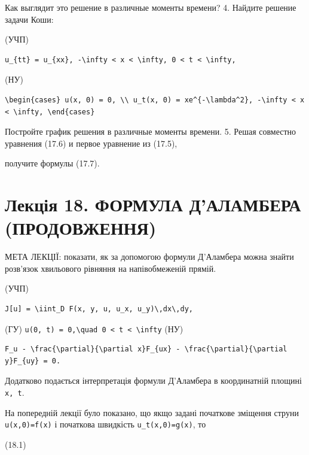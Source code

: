 \documentclass[
  ukrainian,
]{article}
\begin{document}
Как выглядит это решение в различные моменты времени? 4. Найдите решение
задачи Коши:

(УЧП)

\begin{verbatim}
u_{tt} = u_{xx}, -\infty < x < \infty, 0 < t < \infty,
\end{verbatim}

(НУ)

\begin{verbatim}
\begin{cases} u(x, 0) = 0, \\ u_t(x, 0) = xe^{-\lambda^2}, -\infty < x < \infty, \end{cases}
\end{verbatim}

Постройте график решения в различные моменты времени. 5. Решая совместно
уравнения (17.6) и первое уравнение из (17.5),

получите формулы (17.7).

\section{Лекція 18. ФОРМУЛА Д'АЛАМБЕРА
(ПРОДОВЖЕННЯ)}\label{ux43bux435ux43aux446ux456ux44f-18.-ux444ux43eux440ux43cux443ux43bux430-ux434ux430ux43bux430ux43cux431ux435ux440ux430-ux43fux440ux43eux434ux43eux432ux436ux435ux43dux43dux44f}

МЕТА ЛЕКЦІЇ: показати, як за допомогою формули Д'Аламбера можна знайти
розв'язок хвильового рівняння на напівобмеженій прямій.

(УЧП)

\begin{verbatim}
J[u] = \iint_D F(x, y, u, u_x, u_y)\,dx\,dy,
\end{verbatim}

(ГУ)
\texttt{u(0,\ t)\ =\ 0,\textbackslash{}quad\ 0\ \textless{}\ t\ \textless{}\ \textbackslash{}infty}
(НУ)

\begin{verbatim}
F_u - \frac{\partial}{\partial x}F_{ux} - \frac{\partial}{\partial y}F_{uy} = 0.
\end{verbatim}

Додатково подається інтерпретація формули Д'Аламбера в координатній
площині \texttt{x,\ t}.

На попередній лекції було показано, що якщо задані початкове зміщення
струни \texttt{u(x,0)=f(x)} і початкова швидкість
\texttt{u\_t(x,0)=g(x)}, то

(18.1)
\end{document}
